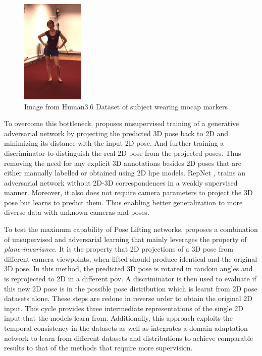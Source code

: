\begin{figure}[!h]
    \centering
    \includegraphics[width=30mm]{figures/h36_mocap.png}
    \caption{Image from Human3.6 Dataset \cite{H3.6} of subject wearing \ac{mocap} markers}
    \label{fig:h36_mocap}
\end{figure}

To overcome this bottleneck, \cite{unsupervisedAdversarial} proposes unsupervised training of a generative adversarial network by projecting the predicted 3D pose back to 2D and minimizing its distance with the input 2D pose. And further training a discriminator to distinguish the real 2D pose from the projected poses. Thus removing the need for any explicit 3D annotations besides 2D poses that are either manually labelled or obtained using 2D \ac{hpe} models. RepNet \cite{repnet}, trains an adversarial network without 2D-3D correspondences in a weakly supervised manner. Moreover, it also does not require camera parameters to project the 3D pose but learns to predict them. Thus enabling better generalization to more diverse data with unknown cameras and poses.

To test the maximum capability of Pose Lifting networks, \cite{amazon1} proposes a combination of unsupervised and adversarial learning that mainly leverages the property of \textit{plane-invariance}. It is the property that 2D projections of a 3D pose from different camera viewpoints, when lifted should produce identical and the original 3D pose. In this method, the predicted 3D pose is rotated in random angles and is reprojected to 2D in a different \ac{pov}. A discriminator is then used to evaluate if this new 2D pose is in the possible pose distribution which is learnt from 2D pose datasets alone. These steps are redone in reverse order to obtain the original 2D input. This cycle provides three intermediate representations of the single 2D input that the models learn from. Additionally, this approach exploits the temporal consistency in the datasets as well as integrates a domain adaptation network to learn from different datasets and distributions to achieve comparable results to that of the methods that require more supervision.


